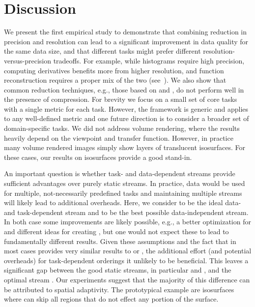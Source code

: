 \section{Discussion}

We present the first empirical study to demonstrate that combining reduction in precision and
resolution can lead to a significant improvement in data quality for the same data size, and that
different tasks might prefer different resolution-versus-precision tradeoffs. For example, while
histograms require high precision, computing derivatives benefits more from higher resolution, and
function reconstruction requires a proper mix of the two (see~). We also show
that common reduction techniques, e.g., those based on \slvl and \smag, do not perform well in the
presence of compression. For brevity we focus on a small set of core tasks with a single metric for
each task. However, the framework is generic and applies to any well-defined metric and one future
direction is to consider a broader set of domain-specific tasks. We did not address volume
rendering, where the results heavily depend on the viewpoint and transfer function. However,
in practice many volume rendered images simply show layers of
translucent isosurfaces. For these cases, our results on isosurfaces provide a good stand-in.

An important question is whether task- and data-dependent streams provide sufficient advantages over
purely static streams. In practice, data would be used for multiple, not-necessarily predefined tasks
and maintaining multiple streams will likely lead to additional overheads. Here, we consider \sopt
to be the ideal data- and task-dependent stream and \ssig to be the best possible data-independent
stream. In both case some improvements are likely possible, e.g., a better optimization for \sopt
and different ideas for creating \ssig, but one would not expect these to lead to fundamentally
different results. Given these assumptions and the fact that \ssig in most cases provides very
similar results to \sbit or \swav, the additional effort (and potential overheads) for
task-dependent orderings it unlikely to be beneficial. This leaves a significant gap between the
good static streams, in particular \swav and \sbit, and the optimal stream \sopt. Our experiments
suggest that the majority of this difference can be attributed to spatial adaptivity. The
prototypical example are isosurfaces where \sopt can skip all regions that do not effect any
portion of the surface.


